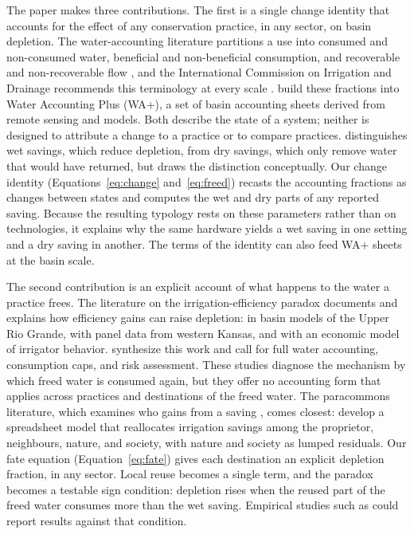 \documentclass[11pt]{article}
\begin{document}
The paper makes three contributions. The first is a single change identity that accounts for the effect of any conservation practice, in any sector, on basin depletion. The water-accounting literature partitions a use into consumed and non-consumed water, beneficial and non-beneficial consumption, and recoverable and non-recoverable flow \citep{molden1997,perry2007}, and the International Commission on Irrigation and Drainage recommends this terminology at every scale \citep{perry2009}. \citet{karimi2013} build these fractions into Water Accounting Plus (WA+), a set of basin accounting sheets derived from remote sensing and models. Both describe the state of a system; neither is designed to attribute a change to a practice or to compare practices. \citet{seckler1996} distinguishes wet savings, which reduce depletion, from dry savings, which only remove water that would have returned, but draws the distinction conceptually. Our change identity (Equations~\eqref{eq:change} and~\eqref{eq:freed}) recasts the accounting fractions as changes between states and computes the wet and dry parts of any reported saving. Because the resulting typology rests on these parameters rather than on technologies, it explains why the same hardware yields a wet saving in one setting and a dry saving in another. The terms of the identity can also feed WA+ sheets at the basin scale.

The second contribution is an explicit account of what happens to the water a practice frees. The literature on the irrigation-efficiency paradox documents and explains how efficiency gains can raise depletion: \citet{ward2008} in basin models of the Upper Rio Grande, \citet{pfeiffer2014} with panel data from western Kansas, and \citet{contor2013} with an economic model of irrigator behavior. \citet{grafton2018} synthesize this work and call for full water accounting, consumption caps, and risk assessment. These studies diagnose the mechanism by which freed water is consumed again, but they offer no accounting form that applies across practices and destinations of the freed water. The paracommons literature, which examines who gains from a saving \citep{lankford2013}, comes closest: \citet{lankford2023} develop a spreadsheet model that reallocates irrigation savings among the proprietor, neighbours, nature, and society, with nature and society as lumped residuals. Our fate equation (Equation~\eqref{eq:fate}) gives each destination an explicit depletion fraction, in any sector. Local reuse becomes a single term, and the paradox becomes a testable sign condition: depletion rises when the reused part of the freed water consumes more than the wet saving. Empirical studies such as \citet{pfeiffer2014} could report results against that condition.
\end{document}
